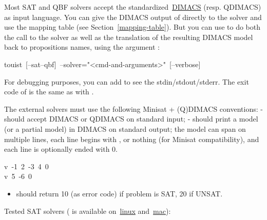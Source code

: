 \noindent Most SAT and QBF solvers accept the standardized~\href{http://www.satcompetition.org/2009/format-benchmarks2009.html}{DIMACS} (resp.
QDIMACS) as input language. You can give the DIMACS output of 
directly to the solver and use the mapping table (see Section~\ref{mapping-table}).
But you can use \touist to do both the call to the solver as well as the
translation of the resulting DIMACS model back to propositions names, using
the argument :%
\begin{mdpre}%
\noindent{}touist~{}[--sat\textbar{}--qbf]~--solver="\textless{}cmd-and-arguments\textgreater{}"~{}[--verbose]%
\end{mdpre}\noindent For debugging purposes, you can add  to see the stdin/stdout/stderr.
The exit code of  is the same as with .

The external solvers must use the following Minisat + (Q)DIMACS conventions:
- should accept DIMACS or QDIMACS on standard input;
- should print a model (or a partial model) in DIMACS on standard output; the
  model can span on multiple lines, each line begins with , 
  or nothing (for Minisat compatibility), and each line is optionally ended
  with 0.%
\begin{mdpre}%
\noindent{}v~-1~2~-3~4~0\\
v~5~-6~0%
\end{mdpre}
\begin{itemize}[noitemsep,topsep=\mdcompacttopsep]%

\item should return 10 (as error code) if problem is SAT, 20 if UNSAT.%
\end{itemize}%

\noindent Tested SAT solvers ( is available on~\href{http://linuxbrew.sh}{linux} and~\href{https://brew.sh}{mac}):%

